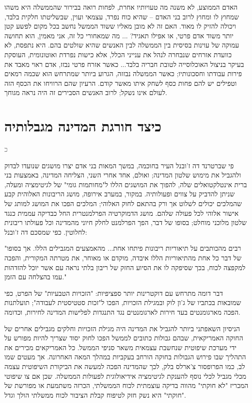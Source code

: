 \documentclass[10pt,oneside]{book}
\newcommand{\hebrewchapter}[2]{%
  \chapter*{#1}%
  \addcontentsline{toc}{chapter}{#1}%
  \lettrine[lines=4, lhang=0.1, loversize=0.5, findent=0pt]{\textcolor{gray} #2}{}%
}
\begin{document}
\begin{quoting}
האדם הממוצע, לא משנה מה טעויותיו אחרת, לפחות רואה בבירור שהממשלה היא משהו שמחוץ לו ומחוץ לרוב בני האדם – שהיא כוח נפרד, עצמאי ועוין, שבשליטתו חלקית בלבד, ויכולה להזיק לו מאוד. האם זה לא מובן מאליו ששוד הממשל נחשב בכל מקום לפשע קטן יותר משוד אדם פרטי, או אפילו תאגיד? ... מה שמאחורי כל זה, אני מאמין, הוא תחושה עמוקה של עוינות בסיסית בין הממשלה לבין האנשים שהיא שולטים בהם. היא נתפסת, לא כוועדת אזרחים שנבחרה לנהל את ענייני הכלל, אלא כישות נפרדת ואוטונומית, העוסקת בעיקר בניצול האוכלוסייה לטובת חבריה בלבד... כאשר אזרח פרטי נבזז, אדם ראוי מאבד את פירות עבודתו וחסכונותיו; כאשר הממשלה נבזזה, הגרוע ביותר שמתרחש הוא שכמה רמאים וטפילים יש להם פחות כסף לשחק איתו מאשר קודם. הרעיון שהם הרוויחו את הכסף הזה לעולם אינו נשקל; לרוב האנשים הסבירים זה היה נראה מגוחך.
\end{quoting}

\hebrewchapter{כיצד חורגת המדינה מגבלותיה}{כ}
פי שברטרנד דה ז'ובנל העיר בחוכמה, במשך המאות בני אדם יצרו מושגים שנועדו לבדוק ולהגביל את מימוש שלטון המדינה; ואולם, אחד אחרי השני, הצליחה המדינה, באמצעות בני ברית אינטלקטואלים שלה, להפוך את המושגים הללו ל"מחותמות גומי" של לגיטימציה ומעלה, שניתן להדביק על צווים ופעולותיה. במקור, במערב אירופה, מושג הריבונות האלוהית קבע שהמלכים יכולים לשלוט אך ורק בהתאם לחוק האלוהי; המלכים הפכו את המושג למותג של אישור אלוהי לכל פעולה שלהם. מושג הדמוקרטיה הפרלמנטרית החל כבדיקה עממית כנגד שלטון מלוכני מוחלט; בסופו של דבר, הפך הפרלמנט לחלק חיוני מהמדינה וכל פעולתו ריבונית לחלוטין. כפי שמסכם דה ז'ובנל:

\begin{quoting}
"רבים מהכותבים על תיאוריות ריבונות פיתחו אחת... מהאמצעים המגבילים הללו. אך בסופו של דבר כל אחת מהתיאוריות הללו איבדה, מוקדם או מאוחר, את מטרתה המקורית, והפכה למקפצה לכוח, בכך שסיפקה לו את הסיוע החזק של ריבון בלתי נראה עם אשר יוכל להזדהות עמו בהצלחה עם הזמן."
\end{quoting}

דבר דומה מתרחש עם דוקטרינות יותר ספציפיות: "הזכויות הטבעיות" של הפרט, כפי שמובאות בכתביו של ג'ון לוק ובמגילת הזכויות, הפכו ל"זכות סטטיסטית לעבודה"; תועלתנות הפכה מארגומנטים בעד חירות לארגומנטים נגד התנגדות לפלישות המדינה לחירות, וכדומה.

הניסיון השאפתני ביותר להגביל את המדינה היה מגילת הזכויות וחלקים מגבילים אחרים של החוקה האמריקאית, שבהם גבולות כתובים לממשל הפכו לחוק יסוד שצריך להיות מפורש על ידי מערכת שיפוטית שנחשבת עצמאית משאר סניפי הממשל. כל האמריקאים מכירים את התהליך שבו פירוש הגבולות בחוקה הורחב בעקביות במהלך המאה האחרונה. אך מעטים שמו לב, כמו הפרופסור צ'ארלס בלק, לכך שהמדינה הפכה למעשה את הביקורת השיפוטית עצמה מכלי מגביל לכלי נוסף להענקת לגיטימציה אידיאולוגית לפעולות הממשלה. שכן אם צו שיפוטי המכריז "לא חוקתי" מהווה בדיקה עוצמתית לכוח הממשלתי, הכרזה משתמעת או מפורשת של "חוקתי" היא נשק חזק לטיפוח קבלת הציבור לכוח ממשלתי הולך וגדל.
\end{document}
